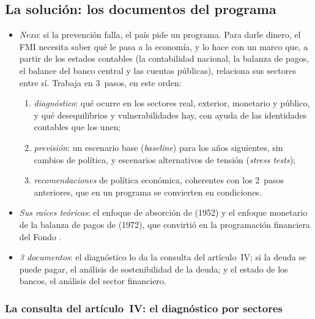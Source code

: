 \documentclass[11pt]{article}
\begin{document}
\subsection{La solución: los documentos del programa}\label{sec:solucion}

\begin{itemize}
\item \emph{Nexo}: si la prevención falla, el país pide un programa. Para darle dinero, el FMI necesita saber qué le pasa a la economía, y lo hace con un marco que, a partir de los estados contables (la contabilidad nacional, la balanza de pagos, el balance del banco central y las cuentas públicas), relaciona sus sectores entre sí. Trabaja en 3~pasos, en este orden:
  \begin{enumerate}
  \item \emph{diagnóstico}: qué ocurre en los sectores real, exterior, monetario y público, y qué desequilibrios y vulnerabilidades hay, con ayuda de las identidades contables que los unen;
  \item \emph{previsión}: un escenario base (\emph{baseline}) para los años siguientes, sin cambios de política, y escenarios alternativos de tensión (\emph{stress tests});
  \item \emph{recomendaciones} de política económica, coherentes con los 2~pasos anteriores, que en un programa se convierten en condiciones.
  \end{enumerate}
\item \emph{Sus raíces teóricas}: el enfoque de absorción de  (1952) y el enfoque monetario de la balanza de pagos de  (1972), que  convirtió en la programación financiera del Fondo\nocite{Alexander1952Effects,Johnson1972Monetary} .
\item \emph{3 documentos}: el diagnóstico lo da la consulta del artículo~IV; si la deuda se puede pagar, el análisis de sostenibilidad de la deuda; y el estado de los bancos, el análisis del sector financiero.
\end{itemize}

\subsubsection{La consulta del artículo~IV: el diagnóstico por sectores}\label{sec:documentos}
\end{document}
